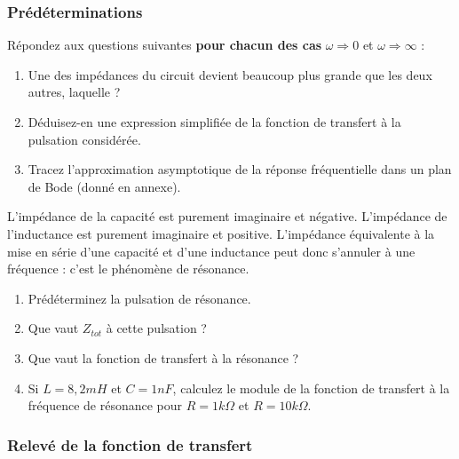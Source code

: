 \documentclass{../template/labo}
\begin{document}
\subsubsection{Prédéterminations}\label{sec:predetRLC}

\begin{predet}
\Question
{
Répondez aux questions suivantes \textbf{pour chacun des cas} $\omega \Rightarrow 0$ et  $\omega \Rightarrow \infty$ :
\begin{enumerate}
\item Une des impédances du circuit devient beaucoup plus grande que les deux autres, laquelle ?
\item Déduisez-en une expression simplifiée de la fonction de transfert à la pulsation considérée.
\item Tracez l'approximation asymptotique de la réponse fréquentielle dans un plan de Bode (donné en annexe).
\end{enumerate}
}
{}

\Question
{
L'impédance de la capacité est purement imaginaire et négative. L'impédance de l'inductance est purement
imaginaire et positive.
L'impédance équivalente à la mise en série d'une capacité et d'une inductance peut donc s'annuler à une fréquence :
c'est le phénomène de résonance.
\begin{enumerate}
\item Prédéterminez la pulsation de résonance.
\item Que vaut $Z_{tot}$ à cette pulsation ?
\item Que vaut la fonction de transfert à la résonance ?
\item Si $L = 8,2mH$ et $C = 1nF$, calculez le module de la fonction de transfert à la fréquence de résonance pour $R = 1 k\Omega$ et $R = 10 k\Omega$.
\end{enumerate}
}
{}
\end{predet}

\subsubsection{Relevé de la fonction de transfert}
\end{document}
